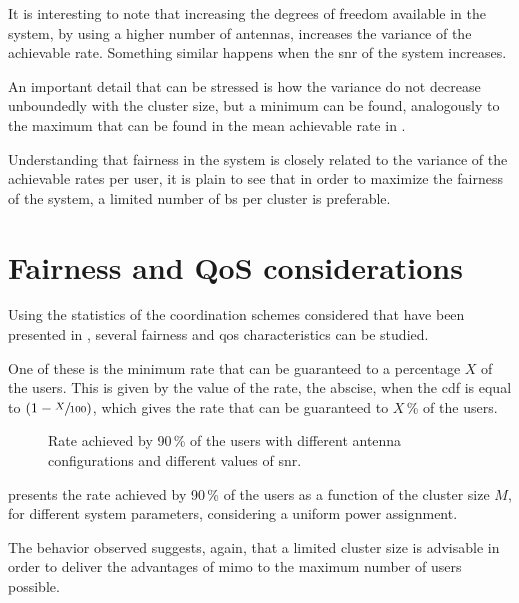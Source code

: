 It is interesting to note that increasing the degrees of freedom available in
the system, by using a higher number of antennas, increases the variance of the
achievable rate. Something similar happens when the \gls{snr} of the system
increases.

An important detail that can be stressed is how the variance do not decrease
unboundedly with the cluster size, but a minimum can be found, analogously to
the maximum that can be found in the mean achievable rate in
.

Understanding that fairness in the system is closely related to the variance of
the achievable rates per user, it is plain to see that in order to maximize the
fairness of the system, a limited number of \gls{bs} per cluster is preferable.

\section{Fairness and QoS considerations}\label{sec:stats_fairnes_qos}

Using the statistics of the coordination schemes considered that have been
presented in , several fairness and \gls{qos}
characteristics can be studied.

One of these is the minimum rate that can be guaranteed to a percentage $X$ of
the users. This is given by the value of the rate, the abscise, when the
\gls{cdf} is equal to $\left(1 - \sfrac{X}{100}\right)$, which gives the rate
that can be guaranteed to $X$\,\% of the users.

\begin{figure}[t]
\begin{center}
    \dummybox
\end{center}
\caption{Rate achieved by 90\,\% of the users with different antenna
configurations and different values of \gls{snr}.}
\label{fig:min_rate_sys_param}
\end{figure}

 presents the rate achieved by 90\,\% of the users
as a function of the cluster size $M$, for different system parameters,
considering a uniform power assignment.

The behavior observed suggests, again, that a limited cluster size is advisable
in order to deliver the advantages of \gls{mimo} to the maximum number of users
possible.

